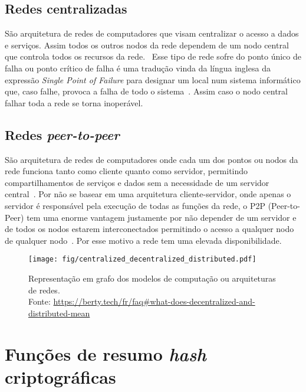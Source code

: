 \subsection{Redes centralizadas}

São arquitetura de redes de computadores que visam centralizar o acesso a dados e serviços.
Assim todos os outros nodos da rede dependem de um nodo central que controla todos os recursos da rede.~\cite{wiki:modelorede}
Esse tipo de rede sofre do ponto único de falha ou ponto crítico de falha é uma tradução vinda da língua inglesa da expressão \textit{Single Point of Failure} para designar um local num sistema informático que, caso falhe, provoca a falha de todo o sistema~\cite{wiki:modelorede}.
Assim caso o nodo central falhar toda a rede se torna inoperável.

\subsection{Redes \textit{peer-to-peer}}

São arquitetura de redes de computadores onde cada um dos pontos ou nodos da rede funciona tanto como cliente quanto como servidor, permitindo compartilhamentos de serviços e dados sem a necessidade de um servidor central~\cite{wiki:modelorede}.
Por não se basear em uma arquitetura cliente-servidor, onde apenas o servidor é responsável pela execução de todas as funções da rede, o P2P (Peer-to-Peer) tem uma enorme vantagem justamente por não depender de um servidor e de todos os nodos estarem interconectados permitindo o acesso a qualquer nodo de qualquer nodo~\cite{wiki:modelorede}.
Por esse motivo a rede tem uma elevada disponibilidade.%

\begin{figure}[htb!]
    \centering
    \texttt{[image: fig/centralized\_decentralized\_distributed.pdf]}
    \caption[Graph representation of network architectures]{
        Representação em grafo dos modelos de computação ou arquiteturas de redes.\\
        Fonte: \url{https://berty.tech/fr/faq#what-does-decentralized-and-distributed-mean}
    }
    \label{fig:tipos-de-redes}
\end{figure}


\section{Funções de resumo \textit{hash} criptográficas}

